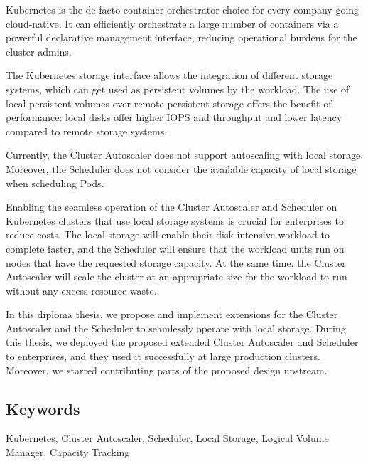 \abstract
{}

Kubernetes is the de facto container orchestrator choice for every company going
cloud-native. It can efficiently orchestrate a large number of containers via a
powerful declarative management interface, reducing operational burdens for the
cluster admins. 

The Kubernetes storage interface allows the integration of different storage
systems, which can get used as persistent volumes by the workload. The use of
local persistent volumes over remote persistent storage offers the benefit of
performance: local disks offer higher IOPS and throughput and lower latency
compared to remote storage systems.

Currently, the Cluster Autoscaler does not support autoscaling with local
storage. Moreover, the Scheduler does not consider the available capacity of
local storage when scheduling Pods.

Enabling the seamless operation of the Cluster Autoscaler and Scheduler on
Kubernetes clusters that use local storage systems is crucial for enterprises to
reduce costs. The local storage will enable their disk-intensive workload to
complete faster, and the Scheduler will ensure that the workload units run on
nodes that have the requested storage capacity. At the same time, the Cluster
Autoscaler will scale the cluster at an appropriate size for the workload to run
without any excess resource waste.

In this diploma thesis, we propose and implement extensions for the Cluster
Autoscaler and the Scheduler to seamlessly operate with local storage. During
this thesis, we deployed the proposed extended Cluster Autoscaler and Scheduler
to enterprises, and they used it successfully at large production clusters.
Moreover, we started contributing parts of the proposed design upstream.

\subsection*{Keywords}
Kubernetes, Cluster Autoscaler, Scheduler, Local Storage, Logical Volume
Manager, Capacity Tracking

